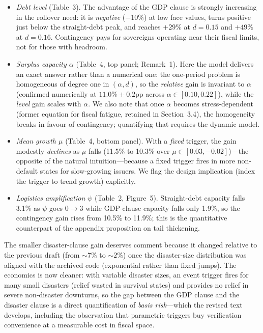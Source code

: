 \documentclass[11pt]{article}
\newcounter{comment}
\begin{document}
\begin{itemize}
\item[(i)] \emph{Debt level} (Table~3). The advantage of the GDP clause is strongly increasing in the rollover need: it is \emph{negative} ($-10\%$) at low face values, turns positive just below the straight-debt peak, and reaches $+29\%$ at $d=0.15$ and $+49\%$ at $d=0.16$. Contingency pays for sovereigns operating near their fiscal limits, not for those with headroom.
\item[(ii)] \emph{Surplus capacity $\alpha$} (Table~4, top panel; Remark~1). Here the model delivers an exact answer rather than a numerical one: the one-period problem is homogeneous of degree one in $(\alpha,d)$, so the \emph{relative} gain is invariant to $\alpha$ (confirmed numerically at $11.0\%\pm0.2$pp across $\alpha\in[0.10,0.22]$), while the \emph{level} gain scales with $\alpha$. We also note that once $\alpha$ becomes stress-dependent (former equation for fiscal fatigue, retained in Section~3.4), the homogeneity breaks in favour of contingency; quantifying that requires the dynamic model.
\item[(iii)] \emph{Mean growth $\mu$} (Table~4, bottom panel). With a \emph{fixed} trigger, the gain modestly \emph{declines} as $\mu$ falls (11.5\% to 10.3\% over $\mu\in[0.03,-0.02]$)---the opposite of the natural intuition---because a fixed trigger fires in more non-default states for slow-growing issuers. We flag the design implication (index the trigger to trend growth) explicitly.
\item[(iv)] \emph{Logistics amplification $\psi$} (Table~2, Figure~5). Straight-debt capacity falls 3.1\% as $\psi$ goes $0\to3$ while GDP-clause capacity falls only 1.9\%, so the contingency gain rises from 10.5\% to 11.9\%; this is the quantitative counterpart of the appendix proposition on tail thickening.
\end{itemize}

The smaller disaster-clause gain deserves comment because it changed relative to the previous draft (from ${\sim}7\%$ to ${\sim}2\%$) once the disaster-size distribution was aligned with the archived code (exponential rather than fixed jumps). The economics is now cleaner: with variable disaster sizes, an event trigger fires for many small disasters (relief wasted in survival states) and provides no relief in severe non-disaster downturns, so the gap between the GDP clause and the disaster clause is a direct quantification of \emph{basis risk}---which the revised text develops, including the observation that parametric triggers buy verification convenience at a measurable cost in fiscal space.
\end{document}
